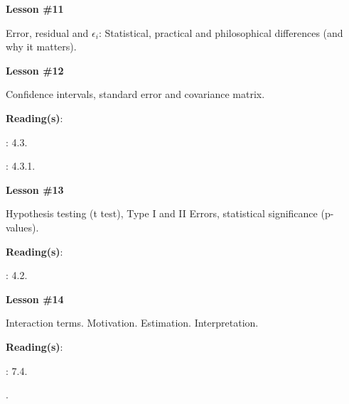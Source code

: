 \documentclass[letterpaper]{article}
\renewenvironment{itemize}{
  \begin{list}{}{
    \setlength{\leftmargin}{1.5em}
  }
}{
  \end{list}
}
\begin{document}
\begin{enumerate}
			\begin{itemize} 
				\item[$\bullet$] {\bf Lesson \#11}
					\begin{itemize} 
						\item[$\circ$] Error, residual and $\epsilon_{i}$: Statistical, practical and philosophical differences (and why it matters).
					\end{itemize}
			\end{itemize}


			\begin{itemize} 
				\item[$\bullet$] {\bf Lesson \#12}
					\begin{itemize} 
						\item[$\circ$] Confidence intervals, standard error and covariance matrix. %
						\item[$\circ$] {\bf Reading(s)}: 
							\begin{itemize}
								\item[$\diamond$] \textcite{Wooldridge2002}: 4.3.
                \item[$\diamond$] \textcite{Fox:2010vc}: 4.3.1.
							\end{itemize}
					\end{itemize}
			\end{itemize}



			\begin{itemize} 
				\item[$\bullet$] {\bf Lesson \#13}
					\begin{itemize} 
						\item[$\circ$] Hypothesis testing (t test), Type I and II Errors, statistical significance (p-values). 
						\item[$\circ$] {\bf Reading(s)}: 
							\begin{itemize}
								\item[$\diamond$] \textcite{Wooldridge2002}: 4.2.
							\end{itemize}
					\end{itemize}
			\end{itemize}



			\begin{itemize} 
				\item[$\bullet$] {\bf Lesson \#14}
					\begin{itemize} 
						\item[$\circ$] Interaction terms. Motivation. Estimation. Interpretation.  
						\item[$\circ$] {\bf Reading(s)}: 
							\begin{itemize}
								\item[$\diamond$] \textcite{Wooldridge2002}: 7.4.
								\item[$\diamond$] .
							\end{itemize}
					\end{itemize}
			\end{itemize}


\end{enumerate}
\end{document}
